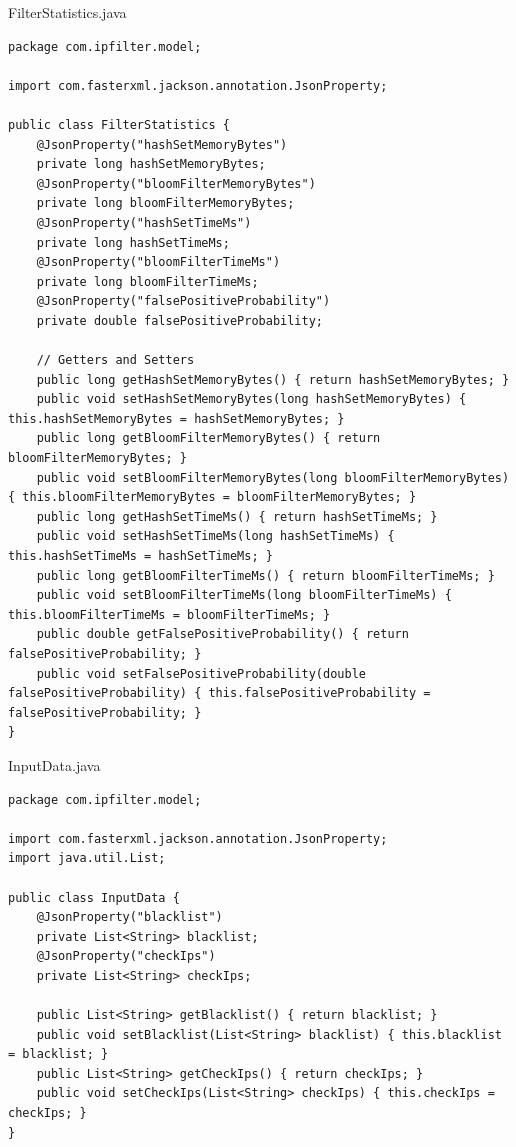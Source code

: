 FilterStatistics.java
\begin{verbatim}
package com.ipfilter.model;

import com.fasterxml.jackson.annotation.JsonProperty;

public class FilterStatistics {
    @JsonProperty("hashSetMemoryBytes")
    private long hashSetMemoryBytes;
    @JsonProperty("bloomFilterMemoryBytes")
    private long bloomFilterMemoryBytes;
    @JsonProperty("hashSetTimeMs")
    private long hashSetTimeMs;
    @JsonProperty("bloomFilterTimeMs")
    private long bloomFilterTimeMs;
    @JsonProperty("falsePositiveProbability")
    private double falsePositiveProbability;

    // Getters and Setters
    public long getHashSetMemoryBytes() { return hashSetMemoryBytes; }
    public void setHashSetMemoryBytes(long hashSetMemoryBytes) { this.hashSetMemoryBytes = hashSetMemoryBytes; }
    public long getBloomFilterMemoryBytes() { return bloomFilterMemoryBytes; }
    public void setBloomFilterMemoryBytes(long bloomFilterMemoryBytes) { this.bloomFilterMemoryBytes = bloomFilterMemoryBytes; }
    public long getHashSetTimeMs() { return hashSetTimeMs; }
    public void setHashSetTimeMs(long hashSetTimeMs) { this.hashSetTimeMs = hashSetTimeMs; }
    public long getBloomFilterTimeMs() { return bloomFilterTimeMs; }
    public void setBloomFilterTimeMs(long bloomFilterTimeMs) { this.bloomFilterTimeMs = bloomFilterTimeMs; }
    public double getFalsePositiveProbability() { return falsePositiveProbability; }
    public void setFalsePositiveProbability(double falsePositiveProbability) { this.falsePositiveProbability = falsePositiveProbability; }
}
\end{verbatim}

InputData.java
\begin{verbatim}
package com.ipfilter.model;

import com.fasterxml.jackson.annotation.JsonProperty;
import java.util.List;

public class InputData {
    @JsonProperty("blacklist")
    private List<String> blacklist;
    @JsonProperty("checkIps")
    private List<String> checkIps;

    public List<String> getBlacklist() { return blacklist; }
    public void setBlacklist(List<String> blacklist) { this.blacklist = blacklist; }
    public List<String> getCheckIps() { return checkIps; }
    public void setCheckIps(List<String> checkIps) { this.checkIps = checkIps; }
}
\end{verbatim}

